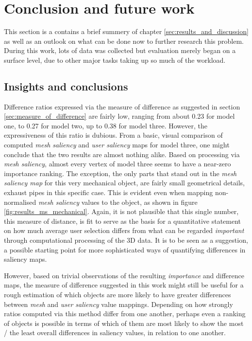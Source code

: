 \chapter{Conclusion and future work}
\label{sec:conclusion_and_future_work}
This section is a contains a brief summery of chapter \ref{sec:results_and_discussion} as well as an outlook on what can be done now to further research this problem. During this work, lots of data was collected but evaluation merely began on a surface level, due to other major tasks taking up so much of the workload.

\section{Insights and conclusions}
\label{insights_and_conclusions}

Difference ratios expressed via the measure of difference as suggested in section \ref{sec:measure_of_difference} are fairly low, ranging from about 0.23 for model one, to 0.27 for model two, up to 0.38 for model three. However, the expressiveness of this ratio is dubious. From a basic, visual comparison of computed \textit{mesh saliency} and \textit{user saliency} maps for model three, one might conclude that the two results are almost nothing alike. Based on processing via \textit{mesh saliency}, almost every vertex of model three seems to have a near-zero importance ranking. The exception, the only parts that stand out in the \textit{mesh saliency map} for this very mechanical object, are fairly small geometrical details, exhaust pipes in this specific case. This is evident even when mapping non-normalised \textit{mesh saliency} values to the object, as shown in figure \ref{fig:results_ms_mechanical}. Again, it is not plausible that this single number, this measure of distance, is fit to serve as the basis for a quantitative statement on how much average user selection differs from what can be regarded \textit{important} through computational processing of the 3D data. It is to be seen as a suggestion, a possible starting point for more sophisticated ways of quantifying differences in saliency maps.

However, based on trivial observations of the resulting \textit{importance} and difference maps, the measure of difference suggested in this work might still be useful for a rough estimation of which objects are more likely to have greater differences between \textit{mesh} and \textit{user saliency} value mappings. Depending on how strongly ratios computed via this method differ from one another, perhaps even a ranking of objects is possible in terms of which of them are most likely to show the most / the least overall differences in saliency values, in relation to one another.

